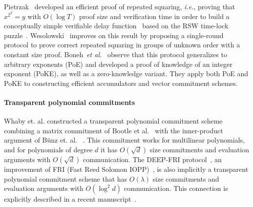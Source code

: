 Pietrzak~\cite{ITCS:Pietrzak18} developed an efficient proof of repeated squaring, \emph{i.e.}, proving that $x^{2^T} = y$ with $O(\log T)$ proof size and verification time in order to build a conceptually simple verifiable delay function~\cite{C:BBBF18} based on the RSW time-lock puzzle~\cite{RivShaWag96}. Wesolowski~\cite{EC:Wesolowski19} improves on this result by proposing a single-round protocol to prove correct repeated squaring in groups of unknown order with a constant size proof. Boneh~\emph{et al.}~\cite{C:BonBunFis19} observe that this protocol generalizes to arbitrary exponents (PoE) and developed a proof of knowledge of an integer exponent (PoKE), as well as a zero-knowledge variant. They apply both PoE and PoKE to constructing efficient accumulators and vector commitment schemes.

\paragraph{Transparent polynomial commitments} 
Whaby et. al. constructed a transparent polynomial commitment scheme combining a matrix commitment of Bootle et al.~\cite{EC:BCCGP16} with the inner-product argument of B\"{u}nz et. al. ~\cite{SP:BBBPWM18}. This commitment works for multilinear polynomials, and for polynomials of degree $d$ it has $O(\sqrt{d})$ size commitments and evaluation arguments with $O(\sqrt{d})$ communication. The DEEP-FRI protocol~\cite{ECCC:BGKS19}, an improvement of FRI (Fast Reed Solomon IOPP)~\cite{ICALP:BBHR18}, is also implicitly a transparent polynomial commitment scheme that has $O(\lambda)$ size commitments and evaluation arguments with $O(\log^2 d)$ communication. This connection is explicitly described in a recent manuscript~\cite{MatterLabs}. 


